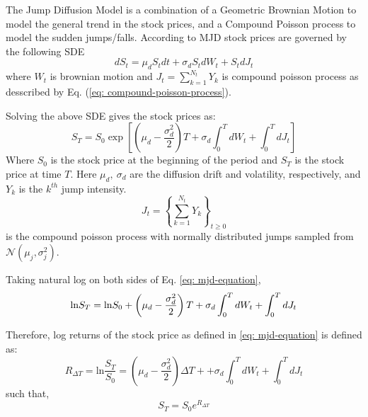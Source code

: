 \documentclass[paper.tex]{subfiles}
\begin{document}
    The Jump Diffusion Model is a combination of a Geometric Brownian Motion to model the general trend in the stock prices, and a Compound Poisson process to model the sudden jumps/falls.
    According to MJD stock prices are governed by the following SDE
    \begin{equation}
        dS_{t} = \mu_{d} S_{t} dt + \sigma_{d} S_{t} dW_{t} + S_{t} dJ_{t}
        \label{eq: mjd-sde}
    \end{equation}
    where $ W_{t} $ is brownian motion and $ J_{t} =  \sum \limits_{k=1}^{N_{t}} Y_{k} $ is compound poisson process as desscribed by Eq. (\ref{eq: compound-poisson-process}).

    Solving the above SDE gives the stock prices as:
    \begin{equation}
        S_{T} = S_0 \exp \left[ \left( \mu_{d}-\dfrac{\sigma_{d}^{2}}{2} \right) T + \sigma_{d} \int_{0}^{T} dW_t + \int_{0}^{T} dJ_{t} \right]
        \label{eq: mjd-equation}
    \end{equation}
    Where $S_0$ is the stock price at the beginning of the period and $ S_{T} $ is the stock price at time $ T $.
    Here $\mu_d, ~ \sigma_d$ are the diffusion drift and volatility, respectively, and $Y_{k}$ is the $ k^{th} $ jump intensity.
    $$ J_{t} = \left \{\sum_{k=1}^{N_{t}}Y_{k} \right \}_{t \geqslant 0} $$ is the compound poisson process with normally distributed jumps sampled from $\mathcal{N}(\mu_{j}, \sigma_{j}^{2})$.

    Taking natural log on both sides of Eq. \ref{eq: mjd-equation},
    \begin{equation}
        \textup{ln}S_{T} = \text{ln}S_{0} + \left( \mu_{d} - \dfrac{\sigma_{d}^{2}}{2} \right) T + \sigma_{d} \int_{0}^{T} dW_t + \int_{0}^{T} dJ_{t}
        \label{eq: mjd-equation-2}
    \end{equation}

    Therefore, log returns of the stock price as defined in \ref{eq: mjd-equation} is defined as:
    \begin{equation}
            R_{\Delta T} = \text{ln} \dfrac{S_{T}}{S_{0}} = \left( \mu_{d} - \dfrac{\sigma_{d}^{2}}{2} \right) {\Delta T} ++ \sigma_{d} \int_{0}^{T} dW_t + \int_{0}^{T} dJ_{t}
            \label{eq: mjd-returns}
    \end{equation}
    such that,
    \begin{equation}
        S_{T} = S_0e^{R_{\Delta T}}
        \label{eq: mjd-equation-3}
    \end{equation}
\end{document}
